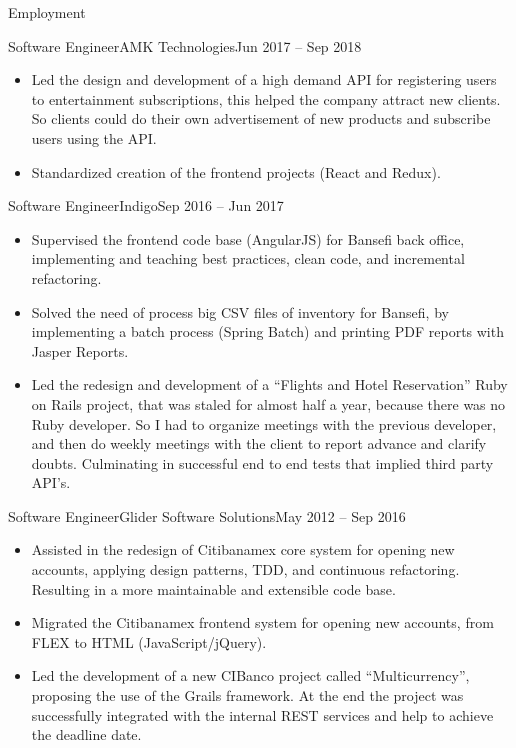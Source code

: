 \documentclass[calibri]{../macdowell-cv/mcdowellcv}
\begin{document}
\begin{cvsection}{Employment}
		\begin{cvsubsection}{Software Engineer}{AMK Technologies}{Jun 2017 -- Sep 2018}
			\begin{itemize}
				\item Led the design and development of a high demand API for registering users to entertainment subscriptions, this helped the company attract new clients. So clients could do their own advertisement of new products and subscribe users using the API.
			\end{itemize}
			\begin{itemize}
				\item Standardized creation of the frontend projects (React and Redux).
			\end{itemize}
		\end{cvsubsection}

		\begin{cvsubsection}{Software Engineer}{Indigo}{Sep 2016 -- Jun 2017}		
			\begin{itemize}
				\item Supervised the frontend code base (AngularJS) for Bansefi back office, implementing and teaching best practices, clean code, and incremental refactoring.
				\item Solved the need of process big CSV files of inventory for Bansefi, by implementing a batch process (Spring Batch) and printing PDF reports with Jasper Reports.
			\end{itemize}
			\begin{itemize}
				\item Led the redesign and development of a ``Flights and Hotel Reservation'' Ruby on Rails project, that was staled for almost half a year, because there was no Ruby developer. So I had to organize meetings with the previous developer, and then do weekly meetings with the client to report advance and clarify doubts. Culminating in successful end to end tests that implied third party API's.
			\end{itemize}
		\end{cvsubsection}
		
		\begin{cvsubsection}{Software Engineer}{Glider Software Solutions}{May 2012 -- Sep 2016}	
			\begin{itemize}
				\item Assisted in the redesign of Citibanamex core system for opening new accounts, applying design patterns, TDD, and continuous refactoring. Resulting in a more maintainable and extensible code base.
				\item Migrated the Citibanamex frontend system for opening new accounts, from FLEX to HTML (JavaScript/jQuery).
				\item Led the development of a new CIBanco project called ``Multicurrency'', proposing the use of the Grails framework. At the end the project was successfully integrated with the internal REST services and help to achieve the deadline date.
			\end{itemize}
		\end{cvsubsection}


\end{cvsection}
\end{document}

